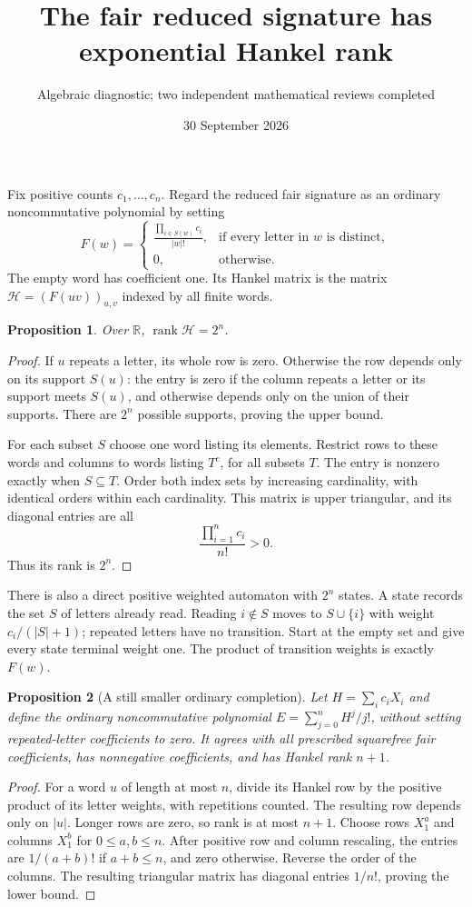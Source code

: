 \documentclass[11pt]{article}
\title{The fair reduced signature has exponential Hankel rank}
\author{Algebraic diagnostic; two independent mathematical reviews completed}
\date{30 September 2026}
\newtheorem{proposition}{Proposition}
\begin{document}
\maketitle
Fix positive counts $c_1,\ldots,c_n$. Regard the reduced fair signature
as an ordinary noncommutative polynomial by setting
\[
 F(w)=\begin{cases}
 \displaystyle\frac{\prod_{i\in S(w)}c_i}{|w|!},
       &\text{if every letter in $w$ is distinct},\\
 0,&\text{otherwise}.
 \end{cases}
\]
The empty word has coefficient one. Its Hankel matrix is the matrix
$\mathcal H=(F(uv))_{u,v}$ indexed by all finite words.

\begin{proposition}
Over $\mathbb R$, $\operatorname{rank}\mathcal H=2^n$.
\end{proposition}
\begin{proof}
If $u$ repeats a letter, its whole row is zero. Otherwise the row
depends only on its support $S(u)$: the entry is zero if the column
repeats a letter or its support meets $S(u)$, and otherwise depends
only on the union of their supports. There are $2^n$ possible
supports, proving the upper bound.

For each subset $S$ choose one word listing its elements. Restrict
rows to these words and columns to words listing $T^c$, for all
subsets $T$. The entry is nonzero exactly when $S\subseteq T$.
Order both index sets by increasing cardinality, with identical
orders within each cardinality. This matrix is upper triangular,
and its diagonal entries are all
\[
 \frac{\prod_{i=1}^n c_i}{n!}>0.
\]
Thus its rank is $2^n$.
\end{proof}

There is also a direct positive weighted automaton with $2^n$ states.
A state records the set $S$ of letters already read. Reading
$i\notin S$ moves to $S\cup\{i\}$ with weight $c_i/(|S|+1)$;
repeated letters have no transition. Start at the empty set and give
every state terminal weight one. The product of transition weights
is exactly $F(w)$.

\begin{proposition}[A still smaller ordinary completion]
Let $H=\sum_i c_iX_i$ and define the ordinary noncommutative
polynomial $E=\sum_{j=0}^n H^j/j!$, without setting repeated-letter
coefficients to zero. It agrees with all prescribed squarefree fair
coefficients, has nonnegative coefficients, and has Hankel rank $n+1$.
\end{proposition}
\begin{proof}
For a word $u$ of length at most $n$, divide its Hankel row by the
positive product of its letter weights, with repetitions counted.
The resulting row depends only on $|u|$. Longer rows are zero,
so rank is at most $n+1$. Choose rows $X_1^a$ and columns $X_1^b$
for $0\le a,b\le n$. After positive row and column rescaling,
the entries are $1/(a+b)!$ if $a+b\le n$, and zero otherwise.
Reverse the order of the columns. The resulting triangular matrix
has diagonal entries $1/n!$, proving the lower bound.
\end{proof}
\end{document}
